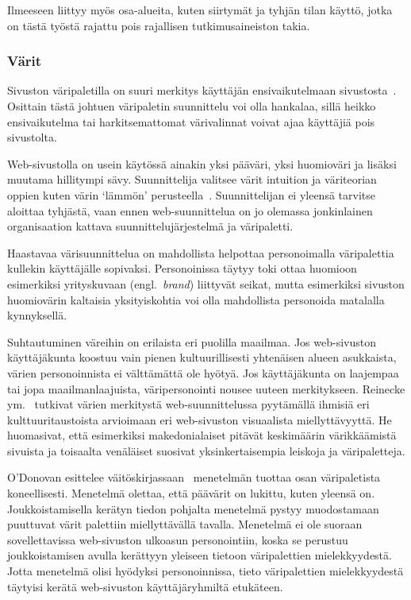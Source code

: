 \documentclass[finnish, 12pt, a4paper, elec, utf8, a-1b, online]{aaltothesis}
\begin{document}
Ilmeeseen liittyy myös osa-alueita, kuten siirtymät ja tyhjän tilan käyttö,
jotka on tästä työstä rajattu pois rajallisen tutkimusaineiston takia.

\subsubsection{Värit}

Sivuston väripaletilla on suuri merkitys käyttäjän ensivaikutelmaan
sivustosta~\cite{10.1145/2470654.2481281}. Osittain tästä johtuen väripaletin
suunnittelu voi olla hankalaa, sillä heikko ensivaikutelma tai harkitsemattomat
värivalinnat voivat ajaa käyttäjiä pois sivustolta.

Web-sivustolla on usein käytössä ainakin yksi pääväri, yksi huomioväri ja
lisäksi muutama hillitympi sävy. Suunnittelija valitsee värit intuition ja
väriteorian oppien kuten värin `lämmön' perusteella~\cite{odonovan_2015}.
Suunnittelijan ei yleensä tarvitse aloittaa tyhjästä, vaan ennen
web-suunnittelua on jo olemassa jonkinlainen organisaation kattava
suunnittelujärjestelmä ja väripaletti.

Haastavaa värisuunnittelua on mahdollista helpottaa personoimalla väripalettia
kullekin käyttäjälle sopivaksi. Personoinissa täytyy toki ottaa huomioon
esimerkiksi yrityskuvaan (engl.~\textit{brand}) liittyvät seikat, mutta
esimerkiksi sivuston huomiovärin kaltaisia yksityiskohtia voi olla mahdollista
personoida matalalla kynnyksellä.

Suhtautuminen väreihin on erilaista eri puolilla maailmaa. Jos web-sivuston
käyttäjäkunta koostuu vain pienen kultuurillisesti yhtenäisen alueen asukkaista,
värien personoinnista ei välttämättä ole hyötyä. Jos käyttäjäkunta on laajempaa
tai jopa maailmanlaajuista, väripersonointi nousee uuteen merkitykseen. Reinecke
ym.~\cite{10.1145/2556288.2557052} tutkivat värien merkitystä web-suunnittelussa
pyytämällä ihmisiä eri kulttuuritaustoista arvioimaan eri web-sivuston
visuaalista miellyttävyyttä. He huomasivat, että esimerkiksi makedonialaiset
pitävät keskimäärin värikkäämistä sivuista ja toisaalta venäläiset suosivat
yksinkertaisempia leiskoja ja väripaletteja.

O'Donovan esittelee väitöskirjassaan~\cite{odonovan_2015} menetelmän tuottaa
osan väripaletista koneellisesti. Menetelmä olettaa, että päävärit on lukittu,
kuten yleensä on. Joukkoistamisella kerätyn tiedon pohjalta menetelmä pystyy
muodostamaan puuttuvat värit palettiin miellyttävällä tavalla. Menetelmä ei ole
suoraan sovellettavissa web-sivuston ulkoasun personointiin, koska se perustuu
joukkoistamisen avulla kerättyyn yleiseen tietoon väripalettien mielekkyydestä.
Jotta menetelmä olisi hyödyksi personoinnissa, tieto väripalettien
mielekkyydestä täytyisi kerätä web-sivuston käyttäjäryhmiltä etukäteen.
\end{document}
